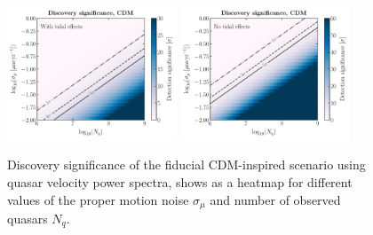 \documentclass[twocolumn]{aastex63}
\begin{document}
\begin{figure}[htbp]
  \centering
  \includegraphics[width=0.45\textwidth]{plots/LCDM_disc}
  \includegraphics[width=0.45\textwidth]{plots/LCDM_disc_notidal}
  \caption{Discovery significance of the fiducial CDM-inspired scenario using quasar velocity power spectra, shows as a heatmap for different values of the proper motion noise $\sigma_\mu$ and number of observed quasars $N_q$.} \label{fig:lcdm_disc}
\end{figure}



\end{document}
